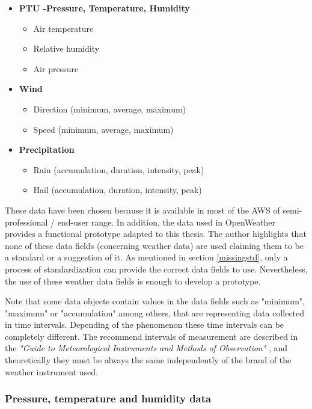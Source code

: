 \begin{itemize}
\item \textbf{PTU -Pressure, Temperature, Humidity}
	\begin{itemize}
		\item Air temperature
		\item Relative humidity
		\item Air pressure
\end{itemize}

\item \textbf{Wind}
	\begin{itemize}
		\item Direction (minimum, average, maximum)
		\item Speed (minimum, average, maximum)
	\end{itemize}
	
\item \textbf{Precipitation}
	\begin{itemize}
		\item Rain (accumulation, duration, intensity, peak)
		\item Hail (accumulation, duration, intensity, peak)
	\end{itemize}
\end{itemize}

These data have been chosen because it is available in most of the \gls{AWS} of semi-professional / end-user range. In addition, the data used in OpenWeather provides a functional prototype adapted to this thesis. The author highlights that none of these data fields (concerning weather data) are used claiming them to be a standard or a suggestion of it. As mentioned in section \ref{missingstd}, only a process of standardization can provide the correct data fields to use. Nevertheless, the use of these weather data fields is enough to develop a prototype.

Note that some data objects contain values in the data fields such as "minimum", "maximum" or "accumulation" among others, that are representing data collected in time intervals. Depending of the phenomenon these time intervals can be completely different. The recommend intervals of measurement are described in the \emph{"Guide to Meteorological Instruments and Methods of Observation"} \cite{GMIMO}, and theoretically they must be always the same independently of the brand of the weather instrument used.

\subsubsection{Pressure, temperature and humidity data}

